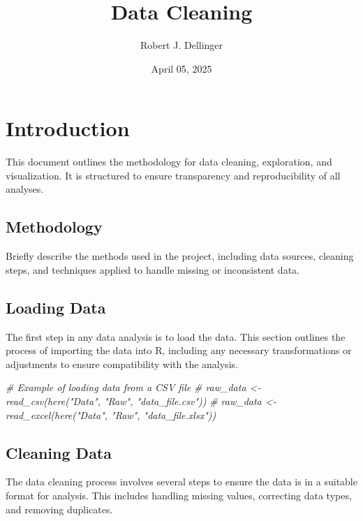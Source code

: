 \documentclass[
]{article}
\title{Data Cleaning}
\author{Robert J. Dellinger}
\date{April 05, 2025}
\newenvironment{Shaded}{\begin{snugshade}}{\end{snugshade}}
\newcommand{\CommentTok}[1]{\textcolor[rgb]{0.56,0.35,0.01}{\textit{#1}}}
\begin{document}
\maketitle

{
\setcounter{tocdepth}{2}
\tableofcontents
}
\section{Introduction}\label{introduction}

This document outlines the methodology for data cleaning, exploration,
and visualization. It is structured to ensure transparency and
reproducibility of all analyses.

\subsection{Methodology}\label{methodology}

Briefly describe the methods used in the project, including data
sources, cleaning steps, and techniques applied to handle missing or
inconsistent data.

\subsection{Loading Data}\label{loading-data}

The first step in any data analysis is to load the data. This section
outlines the process of importing the data into R, including any
necessary transformations or adjustments to ensure compatibility with
the analysis.

\begin{Shaded}
\begin{Highlighting}[]
\CommentTok{\# Example of loading data from a CSV file}
\CommentTok{\# raw\_data \textless{}{-} read\_csv(here("Data", "Raw", "data\_file.csv"))}
\CommentTok{\# raw\_data \textless{}{-} read\_excel(here("Data", "Raw", "data\_file.xlsx"))}
\end{Highlighting}
\end{Shaded}

\subsection{Cleaning Data}\label{cleaning-data}

The data cleaning process involves several steps to ensure the data is
in a suitable format for analysis. This includes handling missing
values, correcting data types, and removing duplicates.
\end{document}
